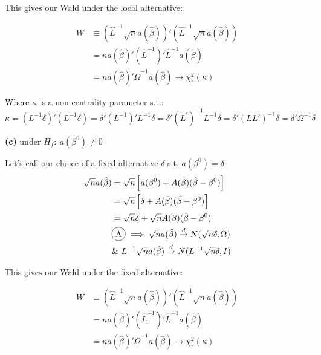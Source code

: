 \documentclass[11pt]{article}
\theoremstyle{definition}
\newcommand*\circled[1]{\tikz[baseline=(char.base)]{
            \node[shape=circle,draw,inner sep=2pt] (char) {#1};}}
\def\indist{\stackrel{d}{\rightarrow}}
\begin{document}
This gives our Wald under the local alternative:

\begin{equation*}
\begin{split}
W & \equiv \left(\hat{L}^{-1}\sqrt{n}a(\hat{\beta})\right)'\left(\hat{L}^{-1}\sqrt{n}a(\hat{\beta})\right) \\
 & =na(\hat{\beta})'(\hat{L}^{-1})'\hat{L}^{-1}a(\hat{\beta}) \\
 & =na(\hat{\beta})'\hat{\Omega}^{-1}a(\hat{\beta}) \rightarrow \chi^{2}_{r}(\kappa)
\end{split}
\end{equation*}

Where $\kappa$ is a non-centrality parameter s.t.: \\

$\kappa = \left(L^{-1}\delta\right)'\left(L^{-1}\delta\right)=\delta'\left(L^{-1}\right)'L^{-1}\delta=\delta'\left(L^{'}\right)^{-1}L^{-1}\delta=\delta'\left(LL'\right)^{-1}\delta=\delta'\Omega^{-1}\delta$

\vspace{15mm}
\noindent
\textbf{(c)} under $H_{f}: \ a(\beta^{0})\neq 0$

Let's call our choice of a fixed alternative $\delta$ s.t.  $a(\beta^{0})= \delta$
\begin{equation*}
\begin{split}
\sqrt{n}a(\hat{\beta}) &=\sqrt{n}\left[a(\beta^{0})+A(\bar{\beta})(\hat{\beta}-\beta^{0})\right] \\
 & =\sqrt{n}\left[\delta+A(\bar{\beta})(\hat{\beta}-\beta^{0})\right] \\
 &=\sqrt{n}\delta + \sqrt{n}A(\bar{\beta})(\hat{\beta}-\beta^{0}) \\
 & \circled{A} \implies \sqrt{n}a(\hat{\beta}) \indist N(\sqrt{n}\delta, \Omega) \\
 & \& \ L^{-1}\sqrt{n}a(\hat{\beta}) \indist N(L^{-1}\sqrt{n}\delta, I)
\end{split}
\end{equation*}

This gives our Wald under the fixed alternative:

\begin{equation*}
\begin{split}
W & \equiv \left(\hat{L}^{-1}\sqrt{n}a(\hat{\beta})\right)'\left(\hat{L}^{-1}\sqrt{n}a(\hat{\beta})\right) \\
 & =na(\hat{\beta})'(\hat{L}^{-1})'\hat{L}^{-1}a(\hat{\beta}) \\
 & =na(\hat{\beta})'\hat{\Omega}^{-1}a(\hat{\beta}) \rightarrow \chi^{2}_{r}(\kappa)
\end{split}
\end{equation*}
\end{document}
